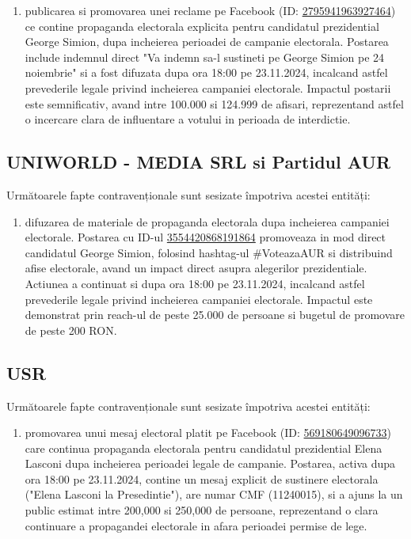 \documentclass[a4paper,12pt]{article}
\begin{document}
\begin{enumerate}[leftmargin=*, label=\arabic*.)]
    \item publicarea si promovarea unei reclame pe Facebook (ID: \href{https://www.facebook.com/ads/library/?id=2795941963927464}{2795941963927464}) ce contine propaganda electorala explicita pentru candidatul prezidential George Simion, dupa incheierea perioadei de campanie electorala. Postarea include indemnul direct "Va indemn sa-l sustineti pe George Simion pe 24 noiembrie" si a fost difuzata dupa ora 18:00 pe 23.11.2024, incalcand astfel prevederile legale privind incheierea campaniei electorale. Impactul postarii este semnificativ, avand intre 100.000 si 124.999 de afisari, reprezentand astfel o incercare clara de influentare a votului in perioada de interdictie.
\end{enumerate}

\vspace{0.5cm}

\subsection{UNIWORLD - MEDIA SRL si Partidul AUR}
Următoarele fapte contravenționale sunt sesizate împotriva acestei entități:

\begin{enumerate}[leftmargin=*, label=\arabic*.)]
    \item difuzarea de materiale de propaganda electorala dupa incheierea campaniei electorale. Postarea cu ID-ul \href{https://www.facebook.com/ads/library/?id=3554420868191864}{3554420868191864} promoveaza in mod direct candidatul George Simion, folosind hashtag-ul \#VoteazaAUR si distribuind afise electorale, avand un impact direct asupra alegerilor prezidentiale. Actiunea a continuat si dupa ora 18:00 pe 23.11.2024, incalcand astfel prevederile legale privind incheierea campaniei electorale. Impactul este demonstrat prin reach-ul de peste 25.000 de persoane si bugetul de promovare de peste 200 RON.
\end{enumerate}

\vspace{0.5cm}

\subsection{USR}
Următoarele fapte contravenționale sunt sesizate împotriva acestei entități:

\begin{enumerate}[leftmargin=*, label=\arabic*.)]
    \item promovarea unui mesaj electoral platit pe Facebook (ID: \href{https://www.facebook.com/ads/library/?id=569180649096733}{569180649096733}) care continua propaganda electorala pentru candidatul prezidential Elena Lasconi dupa incheierea perioadei legale de campanie. Postarea, activa dupa ora 18:00 pe 23.11.2024, contine un mesaj explicit de sustinere electorala ("Elena Lasconi la Presedintie"), are numar CMF (11240015), si a ajuns la un public estimat intre 200,000 si 250,000 de persoane, reprezentand o clara continuare a propagandei electorale in afara perioadei permise de lege.
\end{enumerate}
\end{document}
